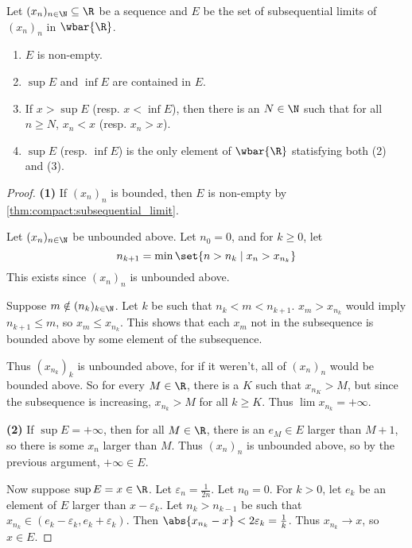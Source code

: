 \begin{theorem} \label{thm:sequences:R:limsup}
    Let $(x_n)_{n \in \N} \subseteq \R$ be a sequence and $E$ be the set of
    subsequential limits of $(x_n)_n$ in $\wbar{\R}$.
    \begin{enumerate}[label=(\arabic*)]
        \item $E$ is non-empty.
        \item $\sup E$ and $\inf E$ are contained in $E$.
        \item If $x > \sup E$ (resp. $x < \inf E$), then there is an
            $N \in \N$ such that for all $n \ge N$, $x_n < x$ (resp.
            $x_n > x$).
        \item $\sup E$ (resp. $\inf E$) is the only element of $\wbar{\R}$
            statisfying both (2) and (3).
    \end{enumerate}
\end{theorem}
\begin{proof}
    \textbf{(1)} If $(x_n)_n$ is bounded, then $E$ is
    non-empty by \cref{thm:compact:subsequential_limit}.

    Let $(x_n)_{n \in \N}$ be unbounded above.
    Let $n_0 = 0$, and for $k \ge 0$, let \[
        n_{k+1} = \min\set{n > n_k \mid x_n > x_{n_k}}
    \]
    This exists since $(x_n)_n$ is unbounded above.

    Suppose $m \notin (n_k)_{k \in \N}$.
    Let $k$ be such that $n_k < m < n_{k+1}$.
    $x_m > x_{n_k}$ would imply $n_{k+1} \le m$, so $x_m \le x_{n_k}$.
    This shows that each $x_m$ not in the subsequence is bounded above by
    some element of the subsequence.

    Thus ${(x_{n_k})}_k$ is unbounded above, for if it weren't, all of
    $(x_n)_n$ would be bounded above.
    So for every $M \in \R$, there is a $K$ such that $x_{n_K} > M$, but
    since the subsequence is increasing, $x_{n_k} > M$ for all $k \ge K$.
    Thus $\lim x_{n_k} = +\infty$.

    \textbf{(2)}
    If $\sup E = +\infty$, then for all $M \in \R$, there is an $e_M \in E$
    larger than $M + 1$, so there is some $x_n$ larger than $M$.
    Thus $(x_n)_n$ is unbounded above, so by the previous argument,
    $+\infty \in E$.

    Now suppose $\sup E = x \in \R$.
    Let $\varepsilon_n = \frac1{2n}$.
    Let $n_0 = 0$.
    For $k > 0$, let $e_k$ be an element of $E$ larger than
    $x - \varepsilon_k$.
    Let $n_k > n_{k-1}$ be such that $x_{n_k} \in (e_k - \varepsilon_k,
    e_k + \varepsilon_k)$.
    Then $\abs{x_{n_k} - x} < 2\varepsilon_k = \frac1k$.
    Thus $x_{n_k} \to x$, so $x \in E$.
\end{proof}
